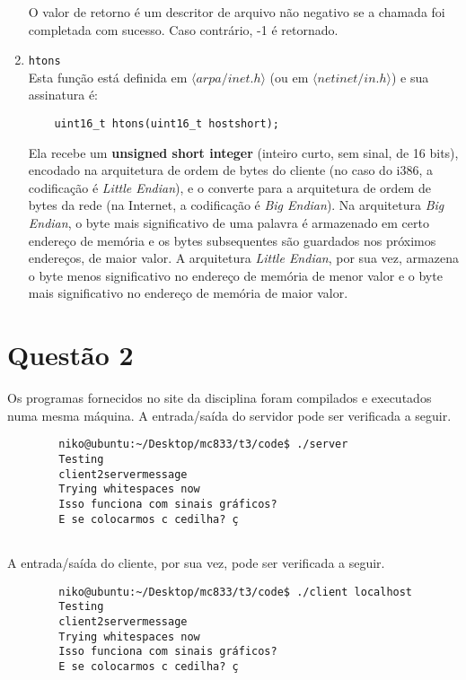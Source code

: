 \documentclass[a4paper,10pt]{article}
\begin{document}
\begin{enumerate}
    O valor de retorno é um descritor de arquivo não negativo se a chamada foi completada com sucesso. Caso contrário, -1 é retornado.
\item {\tt htons}\\
    Esta função está definida em $\langle arpa/inet.h \rangle$ (ou em $\langle netinet/in.h \rangle$) e sua assinatura é:
    \begin{lstlisting}
    uint16_t htons(uint16_t hostshort);
    \end{lstlisting}
    Ela recebe um \textbf{unsigned short integer} (inteiro curto, sem sinal, de 16 bits), encodado na arquitetura de ordem de bytes do cliente (no caso do i386, a codificação é \textit{Little Endian}), e o converte para a arquitetura de ordem de bytes da rede (na Internet, a codificação é \textit{Big Endian}). Na arquitetura \textit{Big Endian}, o byte mais significativo de uma palavra é armazenado em certo endereço de memória e os bytes subsequentes são guardados nos próximos endereços, de maior valor. A arquitetura \textit{Little Endian}, por sua vez, armazena o byte menos significativo no endereço de memória de menor valor e o byte mais significativo no endereço de memória de maior valor.
\end{enumerate}

\section{Questão 2}
    Os programas fornecidos no site da disciplina foram compilados e executados numa mesma máquina. A entrada/saída do servidor pode ser verificada a seguir.
    
    \begin{lstlisting}
        niko@ubuntu:~/Desktop/mc833/t3/code$ ./server
        Testing
        client2servermessage
        Trying whitespaces now
        Isso funciona com sinais gráficos?
        E se colocarmos c cedilha? ç
    
    \end{lstlisting}
    
    A entrada/saída do cliente, por sua vez, pode ser verificada a seguir.
    
    \begin{lstlisting}
        niko@ubuntu:~/Desktop/mc833/t3/code$ ./client localhost
        Testing
        client2servermessage   
        Trying whitespaces now
        Isso funciona com sinais gráficos?
        E se colocarmos c cedilha? ç
    
    \end{lstlisting}
    
\end{document}
